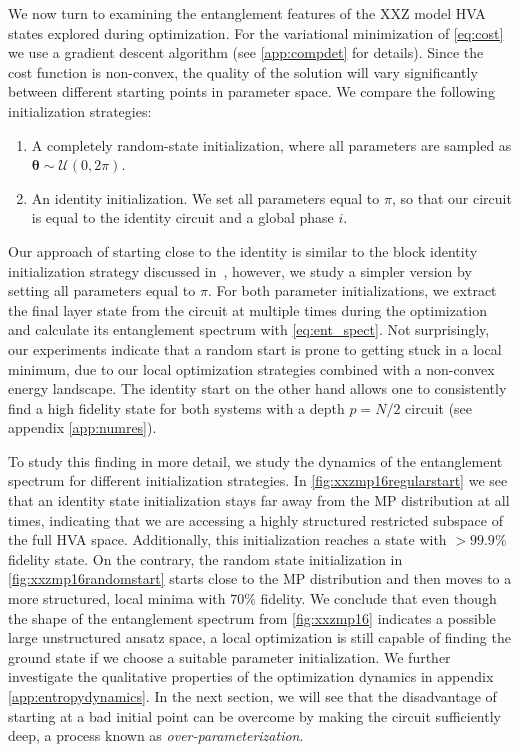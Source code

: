 \documentclass[
 aps,
 pra,
 showpacs,
 showkeys,
 superscriptaddress,
 reprint,%
twocolumn,
]{revtex4-1}
\begin{document}
We now turn to examining the entanglement features of the XXZ model HVA states explored during optimization. For the variational minimization of \cref{eq:cost} we use a gradient descent algorithm (see \cref{app:compdet} for details). Since the cost function is non-convex, the quality of the solution will vary significantly between different starting points in parameter space. We compare the following initialization strategies:
\begin{enumerate}
    \item A completely random-state initialization, where all parameters are sampled as $\bm{\theta}\sim\mathcal{U}(0,2\pi)$.
    \item An identity initialization. We set all parameters equal to $\pi$, so that our circuit is equal to the identity circuit and a global phase $i$. 
\end{enumerate}
Our approach of starting close to the identity is similar to the block identity initialization strategy discussed in~\cite{Grant2019initialization}, however, we study a simpler version by setting all parameters equal to $\pi$. For both parameter initializations, we extract the final layer state from the circuit at multiple times during the optimization and calculate its entanglement spectrum with \cref{eq:ent_spect}. Not surprisingly, our experiments indicate that a random start is prone to getting stuck in a local minimum, due to our local optimization strategies combined with a non-convex energy landscape. The identity start on the other hand allows one to consistently find a high fidelity state for both systems with a depth $p=N/2$ circuit (see appendix \cref{app:numres}). 

To study this finding in more detail, we study the dynamics of the entanglement spectrum for different initialization strategies. In \cref{fig:xxzmp16regularstart} we see that an identity state initialization stays far away from the MP distribution at all times, indicating that we are accessing a highly structured restricted subspace of the full HVA space. Additionally, this initialization reaches a state with $>99.9\%$ fidelity state. On the contrary, the random state initialization in \cref{fig:xxzmp16randomstart} starts close to the MP distribution and then moves to a more structured, local minima with $70\%$ fidelity. We conclude that even though the shape of the entanglement spectrum from \cref{fig:xxzmp16} indicates a possible large unstructured ansatz space, a local optimization is still capable of finding the ground state if we choose a suitable parameter initialization. We further investigate the qualitative properties of the optimization dynamics in appendix \cref{app:entropydynamics}. In the next section, we will see that the disadvantage of starting at a bad initial point can be overcome by making the circuit sufficiently deep, a process known as \emph{over-parameterization}. 
\end{document}

